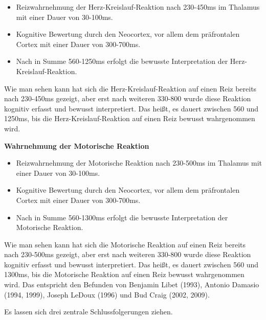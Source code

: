 \begin{itemize}
  \item Reizwahrnehmung der Herz-Kreislauf-Reaktion nach 230-450ms im Thalamus mit einer Dauer von 30-100ms.
  \item Kognitive Bewertung durch den Neocortex, vor allem dem präfrontalen Cortex mit einer Dauer von 300-700ms.
  \item Nach in Summe 560-1250ms erfolgt die bewusste Interpretation der Herz-Kreislauf-Reaktion.
\end{itemize}
Wie man sehen kann hat sich die Herz-Kreislauf-Reaktion auf einen Reiz bereits nach 230-450ms gezeigt, aber erst nach weiteren 330-800 wurde diese Reaktion kognitiv erfasst und bewusst interpretiert. Das heißt, es dauert zwischen 560 und 1250ms, bis die Herz-Kreislauf-Reaktion auf einen Reiz bewusst wahrgenommen wird.

\textbf{Wahrnehmung der Motorische Reaktion}

\begin{itemize}
  \item Reizwahrnehmung der Motorische Reaktion nach 230-500ms im Thalamus mit einer Dauer von 30-100ms.
  \item Kognitive Bewertung durch den Neocortex, vor allem dem präfrontalen Cortex mit einer Dauer von 300-700ms.
  \item Nach in Summe 560-1300ms erfolgt die bewusste Interpretation der Motorische Reaktion.
\end{itemize}
Wie man sehen kann hat sich die Motorische Reaktion auf einen Reiz bereits nach 230-500ms gezeigt, aber erst nach weiteren 330-800 wurde diese Reaktion kognitiv erfasst und bewusst interpretiert. Das heißt, es dauert zwischen 560 und 1300ms, bis die Motorische Reaktion auf einen Reiz bewusst wahrgenommen wird. Das entspricht den Befunden von Benjamin Libet (1993), Antonio Damasio (1994, 1999), Joseph LeDoux (1996) und Bud Craig (2002, 2009).

Es lassen sich drei zentrale Schlussfolgerungen ziehen.

